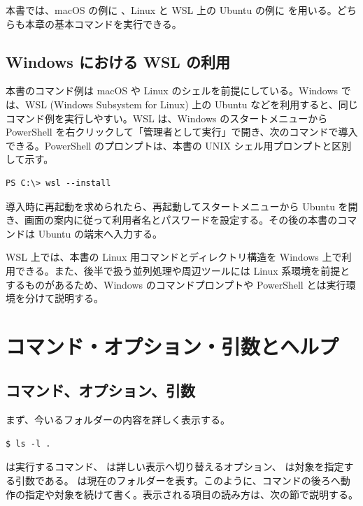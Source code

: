 本書では、macOS の例に 、Linux と WSL 上の Ubuntu の例に  を用いる。どちらも本章の基本コマンドを実行できる。

\subsection{Windows における WSL の利用}

本書のコマンド例は macOS や Linux のシェルを前提にしている。Windows では、WSL (Windows Subsystem for Linux) 上の Ubuntu などを利用すると、同じコマンド例を実行しやすい。WSL は、Windows のスタートメニューから PowerShell を右クリックして「管理者として実行」で開き、次のコマンドで導入できる。PowerShell のプロンプトは、本書の UNIX シェル用プロンプトと区別して示す。

\begin{lstlisting}[numbers=none, xleftmargin=2\zw]
PS C:\> wsl --install
\end{lstlisting}

導入時に再起動を求められたら、再起動してスタートメニューから Ubuntu を開き、画面の案内に従って利用者名とパスワードを設定する。その後の本書のコマンドは Ubuntu の端末へ入力する。

WSL 上では、本書の Linux 用コマンドとディレクトリ構造を Windows 上で利用できる。また、後半で扱う並列処理や周辺ツールには Linux 系環境を前提とするものがあるため、Windows のコマンドプロンプトや PowerShell とは実行環境を分けて説明する。

\section{コマンド・オプション・引数とヘルプ}

\subsection{コマンド、オプション、引数}

まず、今いるフォルダーの内容を詳しく表示する。

\begin{lstlisting}[numbers=none, xleftmargin=2\zw]
$ ls -l .
\end{lstlisting}

 は実行するコマンド、 は詳しい表示へ切り替えるオプション、 は対象を指定する引数である。 は現在のフォルダーを表す。このように、コマンドの後ろへ動作の指定や対象を続けて書く。表示される項目の読み方は、次の節で説明する。

